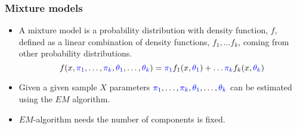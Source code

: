 \begin{frame}

\frametitle{Mixture models}
\begin{itemize}
\item A mixture model is a probability distribution with density function, $f$, defined as a linear combination of density functions, $f_1, \dots f_k$, coming from other probability distributions.
\[
f(x, {\color{blue}\pi_1}, \dots, {\color{blue}\pi_k}, {\color{blue}\theta_1}, \dots, {\color{blue}\theta_k}) = {\color{blue}\pi_1} f_1(x, {\color{blue}\theta_1}) + \dots {\color{blue}\pi_k} f_k(x, {\color{blue}\theta_k})
\]
\item Given a given sample $X$ parameters ${\color{blue}\pi_1}, \dots, {\color{blue}\pi_k}, {\color{blue}\theta_1}, \dots, {\color{blue}\theta_k}$ can be estimated using the $EM$ algorithm.
\item $EM$-algorithm needs the number of components is fixed.
\end{itemize}
\end{frame}

